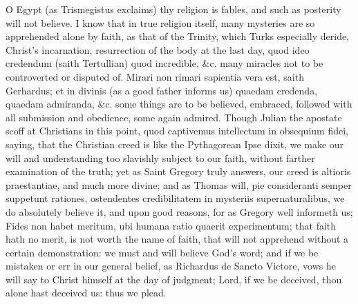 {O Egypt (as Trismegistus exclaims) thy religion is fables, and
such as posterity will not believe. I know that in true religion
itself, many mysteries are so apprehended alone by faith, as that of
the Trinity, which Turks especially deride, Christ's incarnation,
resurrection of the body at the last day, quod ideo credendum (saith
Tertullian) quod incredible, \&c. many miracles not to be controverted
or disputed of. Mirari non rimari sapientia vera est, saith
Gerhardus; et in divinis (as a good father informs us) quaedam
credenda, quaedam admiranda, \&c. some things are to be believed,
embraced, followed with all submission and obedience, some again
admired. Though Julian the apostate scoff at Christians in this point,
quod captivemus intellectum in obsequium fidei, saying, that the
Christian creed is like the Pythagorean Ipse dixit, we make our will
and understanding too slavishly subject to our faith, without farther
examination of the truth; yet as Saint Gregory truly answers, our creed
is altioris praestantiae, and much more divine; and as Thomas will, pie
consideranti semper suppetunt rationes, ostendentes credibilitatem in
mysteriis supernaturalibus, we do absolutely believe it, and upon good
reasons, for as Gregory well informeth us; Fides non habet meritum, ubi
humana ratio quaerit experimentum; that faith hath no merit, is not
worth the name of faith, that will not apprehend without a certain
demonstration: we must and will believe God's word; and if we be
mistaken or err in our general belief, as Richardus de Sancto
Victore, vows he will say to Christ himself at the day of judgment;
Lord, if we be deceived, thou alone hast deceived us: thus we plead.

}
